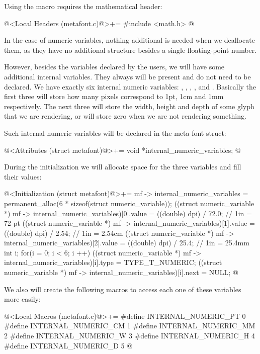 Using the macro  requires the mathematical header:

\iniciocodigo
@<Local Headers (metafont.c)@>+=
#include <math.h>
@
\fimcodigo

In the case of numeric variables, nothing additional is needed when we
deallocate them, as they have no additional structure besides a single
floating-point number.

However, besides the variables declared by the users, we will have
some additional internal variables. They always will be present and do
not need to be declared. We have exactly six internal numeric
variables: , , , ,
 and . Basically the first three
will store how many pixels correspond to 1pt, 1cm and 1mm
respectively. The next three will store the width, height and depth of
some glyph that we are rendering, or will store zero when we are not
rendering something.

Such internal numeric variables will be declared in the meta-font
struct:

\iniciocodigo
@<Attributes (struct metafont)@>+=
void *internal_numeric_variables;
@
\fimcodigo

During the initialization we will allocate space for the three
variables and fill their values:

\iniciocodigo
@<Initialization (struct metafont)@>+=
mf -> internal_numeric_variables =
             permanent_alloc(6 * sizeof(struct numeric_variable));
((struct numeric_variable *) mf -> internal_numeric_variables)[0].value =
   ((double) dpi) / 72.0; // 1in = 72 pt
((struct numeric_variable *) mf -> internal_numeric_variables)[1].value =
   ((double) dpi) / 2.54; // 1in = 2.54cm
((struct numeric_variable *) mf -> internal_numeric_variables)[2].value =
   ((double) dpi) / 25.4; // 1in = 25.4mm
{
  int i;
  for(i = 0; i < 6; i ++){
    ((struct numeric_variable *)
      mf -> internal_numeric_variables)[i].type = TYPE_T_NUMERIC;
    ((struct numeric_variable *)
      mf -> internal_numeric_variables)[i].next = NULL;
  }
}
@
\fimcodigo

We also will create the following macros to access each one of these
variables more easily:

\iniciocodigo
@<Local Macros (metafont.c)@>+=
#define INTERNAL_NUMERIC_PT 0
#define INTERNAL_NUMERIC_CM 1
#define INTERNAL_NUMERIC_MM 2
#define INTERNAL_NUMERIC_W  3
#define INTERNAL_NUMERIC_H  4
#define INTERNAL_NUMERIC_D  5
@
\fimcodigo

